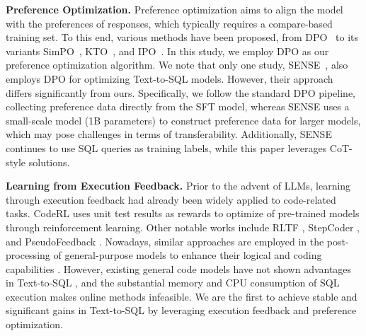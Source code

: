 
\textbf{Preference Optimization.} Preference optimization aims to align the model with the preferences of responses, which typically requires a compare-based training set.  
To this end, various methods have been proposed, from DPO~\citep{rafailov2024dpo} to its variants SimPO~\citep{DBLP:journals/corr/abs-2405-14734simpo}, KTO~\citep{DBLP:journals/corr/abs-2402-01306kto}, and IPO~\citep{DBLP:conf/aistats/AzarGPMRVC24ipo}. In this study, we employ DPO as our preference optimization algorithm. We note that only one study, SENSE~\citep{yang2024sense}, also employs DPO for optimizing Text-to-SQL models. However, their approach differs significantly from ours. Specifically, we follow the standard DPO pipeline, collecting preference data directly from the SFT model, whereas SENSE uses a small-scale model (1B parameters) to construct preference data for larger models, which may pose challenges in terms of transferability. Additionally, SENSE continues to use SQL queries as training labels, while this paper leverages CoT-style solutions.

\textbf{Learning from Execution Feedback.} Prior to the advent of LLMs, learning through execution feedback had already been widely applied to code-related tasks. CodeRL \citep{coderl} uses unit test results as rewards to optimize of pre-trained models through reinforcement learning. Other notable works include RLTF \citep{rltf}, StepCoder \citep{stepcoder}, and PseudoFeedback \citep{psudofeedback}. Nowadays, similar approaches are employed in the post-processing of general-purpose models to enhance their logical and coding capabilities \citep{qwenreport, dscoderv2}. However, existing general code models have not shown advantages in Text-to-SQL \citep{li2024codes}, and the substantial memory and CPU consumption of SQL execution makes online methods infeasible. We are the first to achieve stable and significant gains in Text-to-SQL by leveraging execution feedback and preference optimization.

